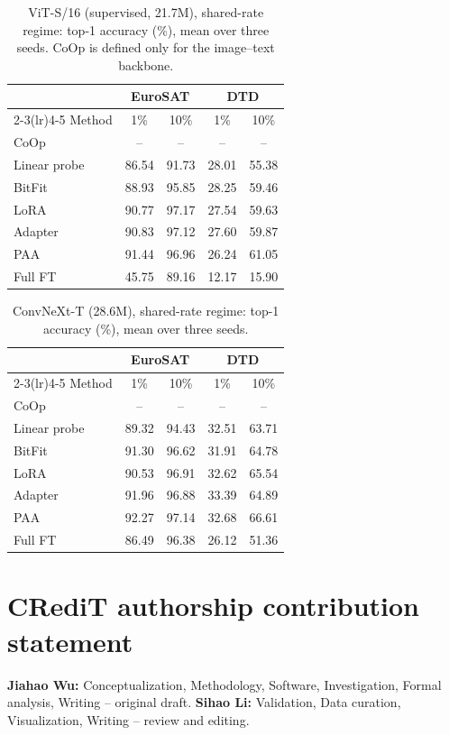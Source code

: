 \documentclass[preprint,12pt]{elsarticle}
\newcommand{\ours}{\textsc{PAA}}
\begin{document}
\begin{table}[h]
\centering
\caption{ViT-S/16 (supervised, 21.7M), shared-rate regime: top-1 accuracy (\%),
mean over three seeds. CoOp is defined only for the image--text backbone.}
\label{tab:app-vits}
\small
\setlength{\tabcolsep}{6pt}
\begin{tabular}{lcccc}
\toprule
 & \multicolumn{2}{c}{EuroSAT} & \multicolumn{2}{c}{DTD} \\
\cmidrule(lr){2-3}\cmidrule(lr){4-5}
Method & 1\% & 10\% & 1\% & 10\% \\
\midrule
CoOp & -- & -- & -- & -- \\
Linear probe & 86.54 & 91.73 & 28.01 & 55.38 \\
BitFit & 88.93 & 95.85 & 28.25 & 59.46 \\
LoRA & 90.77 & 97.17 & 27.54 & 59.63 \\
Adapter & 90.83 & 97.12 & 27.60 & 59.87 \\
\ours & 91.44 & 96.96 & 26.24 & 61.05 \\
Full FT & 45.75 & 89.16 & 12.17 & 15.90 \\
\bottomrule
\end{tabular}
\end{table}

\begin{table}[h]
\centering
\caption{ConvNeXt-T (28.6M), shared-rate regime: top-1 accuracy (\%), mean over
three seeds.}
\label{tab:app-convnext}
\small
\setlength{\tabcolsep}{6pt}
\begin{tabular}{lcccc}
\toprule
 & \multicolumn{2}{c}{EuroSAT} & \multicolumn{2}{c}{DTD} \\
\cmidrule(lr){2-3}\cmidrule(lr){4-5}
Method & 1\% & 10\% & 1\% & 10\% \\
\midrule
CoOp & -- & -- & -- & -- \\
Linear probe & 89.32 & 94.43 & 32.51 & 63.71 \\
BitFit & 91.30 & 96.62 & 31.91 & 64.78 \\
LoRA & 90.53 & 96.91 & 32.62 & 65.54 \\
Adapter & 91.96 & 96.88 & 33.39 & 64.89 \\
\ours & 92.27 & 97.14 & 32.68 & 66.61 \\
Full FT & 86.49 & 96.38 & 26.12 & 51.36 \\
\bottomrule
\end{tabular}
\end{table}

\section*{CRediT authorship contribution statement}
\textbf{Jiahao Wu:} Conceptualization, Methodology, Software, Investigation,
Formal analysis, Writing -- original draft. \textbf{Sihao Li:} Validation, Data
curation, Visualization, Writing -- review and editing.
\end{document}
